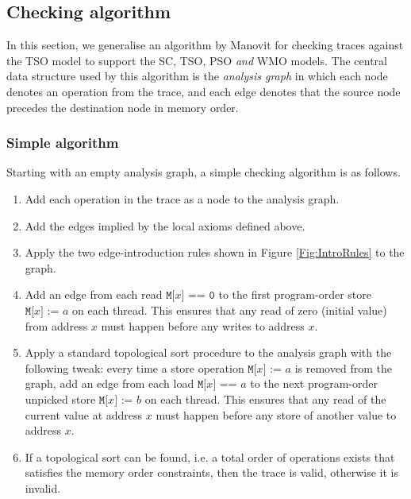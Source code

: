 \documentclass[11pt]{article}
\begin{document}
\subsection{Checking algorithm}

In this section, we generalise an algorithm by Manovit \cite{Manovit}
for checking traces against the TSO model to support the SC, TSO, PSO
\emph{and} WMO models.  The central data structure used by this
algorithm is the \emph{analysis graph} in which each node denotes an
operation from the trace, and each edge denotes that the source node
precedes the destination node in memory order.


\subsubsection*{Simple algorithm}

Starting with an empty analysis graph, a simple checking algorithm is
as follows.

\begin{enumerate}

\item Add each operation in the trace as a node to the analysis graph.

\item Add the edges implied by the local axioms defined
above.

\item Apply the two edge-introduction rules shown in Figure
\ref{Fig:IntroRules} to the graph. 

\item Add an edge from each read $\texttt{M[}x\texttt{] == 0}$ to the
first program-order store $\texttt{M[}x\texttt{] := }a$ on each
thread.  This ensures that any read of zero (initial value) from
address $x$ must happen before any writes to address $x$.

\item Apply a standard topological sort procedure to the analysis
graph with the following tweak: every time a store operation
$\texttt{M[}x\texttt{] := }a$ is removed from the graph, add an edge
from each load $\texttt{M[}x\texttt{] == }a$ to the next
program-order unpicked store $\texttt{M[}x\texttt{] := }b$ on each
thread.  This ensures that any read of the current value at address
$x$ must happen before any store of another value to address $x$.

\item If a topological sort can be found, i.e.  a total order of
operations exists that satisfies the memory order constraints, then
the trace is valid, otherwise it is invalid.

\end{enumerate}
\end{document}
